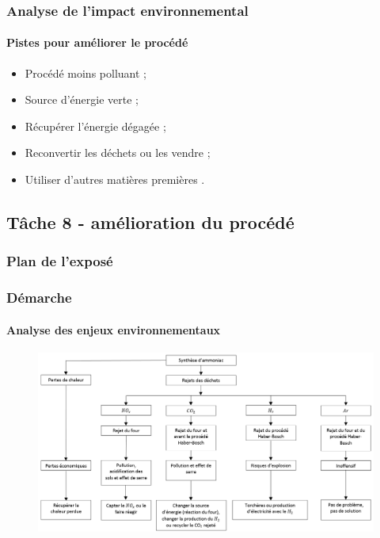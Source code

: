 \documentclass{beamer}
\begin{document}
	\begin{frame}
	\frametitle{Analyse de l'impact environnemental}
	\framesubtitle{Pistes pour améliorer le procédé}
	\begin{itemize}
		\item Procédé moins polluant ;
		\item Source d'énergie verte ;
		\item Récupérer l'énergie dégagée ;
		\item Reconvertir les déchets ou les vendre ;
		\item Utiliser d'autres matières premières .
	\end{itemize}
	\end{frame}
	
	\begin{frame}
		\section{Tâche 8 - amélioration du procédé}
		\frametitle{Plan de l'exposé}
		\tableofcontents[currentsubsection,sectionstyle=show/shaded,subsectionstyle=show/shaded/hide]
	\end{frame}
	
	\begin{frame}
		\frametitle{Démarche}
		\framesubtitle{Analyse des enjeux environnementaux}
		\begin{figure}
			\centering
			\includegraphics[scale=0.40]{media/mindmap.png}
		\end{figure}
	\end{frame}
	
\end{document}
